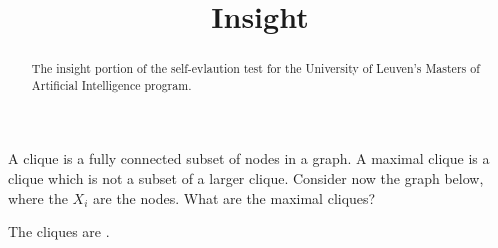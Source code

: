 \documentclass{ximera}
\title{Insight}
\begin{document}
\begin{abstract}
The insight portion of the self-evlaution test for the University of
Leuven's Masters of Artificial Intelligence program.
\end{abstract}
\maketitle


\begin{question}
A clique is  a fully connected subset of nodes in a graph. 
A maximal clique is a clique which is not a subset of a larger clique.
Consider now the graph below, where the $X_i$ are the nodes.  What are the maximal cliques? 
\begin{image}
\end{image}



\begin{solution}
The cliques are .
\end{solution}
\end{question}
\end{document}
